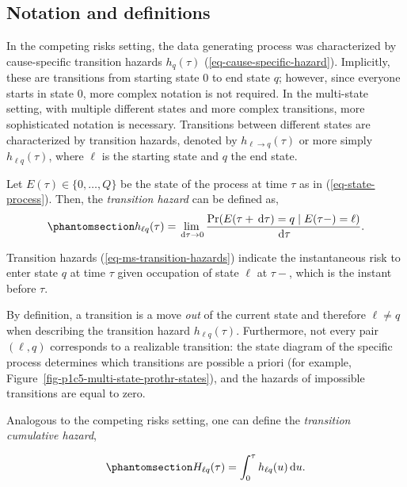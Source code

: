 \documentclass[
  letterpaper,
  krantz2]{style/krantz}
\begin{document}
\subsection{Notation and definitions}\label{notation-and-definitions}

In the competing risks setting, the data generating process was
characterized by cause-specific transition hazards \(h_q(\tau)\)
(\ref{eq-cause-specific-hazard}). Implicitly, these are transitions from
starting state \(0\) to end state \(q\); however, since everyone starts
in state \(0\), more complex notation is not required. In the
multi-state setting, with multiple different states and more complex
transitions, more sophisticated notation is necessary. Transitions
between different states are characterized by transition hazards,
denoted by \(h_{\ell\rightarrow q}(\tau)\) or more simply
\(h_{\ell q}(\tau)\), where \(\ell\) is the starting state and \(q\) the
end state.

Let \(E(\tau)\in \{0,\ldots,Q\}\) be the state of the process at time
\(\tau\) as in (\ref{eq-state-process}). Then, the \emph{transition
hazard} can be defined as,
\begin{equation}\phantomsection\label{eq-ms-transition-hazards}{
h_{\ell q}(\tau) = \lim_{\,\mathrm{d}\tau\to 0} \frac{\Pr(E(\tau + \,\mathrm{d}\tau)=q \mid E(\tau-) = \ell)}{\,\mathrm{d}\tau}.
}\end{equation}

Transition hazards (\ref{eq-ms-transition-hazards}) indicate the
instantaneous risk to enter state \(q\) at time \(\tau\) given
occupation of state \(\ell\) at \(\tau-\), which is the instant before
\(\tau\).

By definition, a transition is a move \emph{out} of the current state
and therefore \(\ell \neq q\) when describing the transition hazard
\(h_{\ell q}(\tau)\). Furthermore, not every pair \((\ell, q)\)
corresponds to a realizable transition: the state diagram of the
specific process determines which transitions are possible a priori (for
example, Figure~\ref{fig-p1c5-multi-state-prothr-states}), and the
hazards of impossible transitions are equal to zero.

Analogous to the competing risks setting, one can define the
\emph{transition cumulative
hazard},

\begin{equation}\phantomsection\label{eq-ms-cumu-hazard}{
H_{\ell q}(\tau) = \int_{0}^{\tau}h_{\ell q}(u) \,\mathrm{d}u.
}\end{equation}
\end{document}
